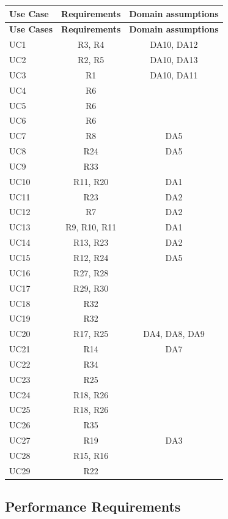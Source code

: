 \begin{longtable}{lcc}
    \hline
    \textbf{Use Case} & \textbf{Requirements} & \textbf{Domain assumptions} \\
    \hline
    \endfirsthead

    \hline
    \textbf{Use Cases} & \textbf{Requirements} & \textbf{Domain assumptions} \\
    \hline
    \endhead
    UC1 & R3, R4 & DA10, DA12 \\ \hline
    UC2 & R2, R5 & DA10, DA13 \\ \hline
    UC3 & R1 & DA10, DA11 \\ \hline
    UC4 & R6 & \\ \hline
    UC5 & R6 & \\ \hline
    UC6 & R6 & \\ \hline
    UC7 & R8 & DA5 \\ \hline
    UC8 & R24 & DA5 \\ \hline
    UC9 & R33 & \\ \hline
    UC10 & R11, R20 & DA1 \\ \hline
    UC11 & R23 & DA2 \\ \hline
    UC12 & R7 & DA2 \\ \hline
    UC13 & R9, R10, R11 & DA1 \\ \hline
    UC14 & R13, R23 & DA2 \\ \hline
    UC15 & R12, R24 & DA5 \\ \hline
    UC16 & R27, R28 & \\ \hline
    UC17 & R29, R30 & \\ \hline
    UC18 & R32 & \\ \hline
    UC19 & R32 & \\ \hline
    UC20 & R17, R25 & DA4, DA8, DA9 \\ \hline
    UC21 & R14 & DA7 \\ \hline
    UC22 & R34 & \\ \hline
    UC23 & R25 & \\ \hline
    UC24 & R18, R26 & \\ \hline
    UC25 & R18, R26 & \\ \hline
    UC26 & R35 & \\ \hline
    UC27 & R19 & DA3 \\ \hline
    UC28 & R15, R16 & \\ \hline
    UC29 & R22 & \\ \hline
\end{longtable}

\subsection{Performance Requirements}
